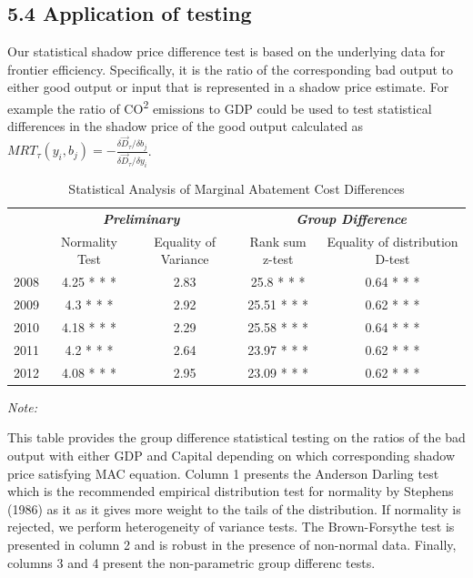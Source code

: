 \documentclass[
  10pt,
]{article}
\begin{document}
\hypertarget{application-of-testing}{%
\subsection{5.4 Application of testing}\label{application-of-testing}}

Our statistical shadow price difference test is based on the underlying
data for frontier efficiency. Specifically, it is the ratio of the
corresponding bad output to either good output or input that is
represented in a shadow price estimate. For example the ratio of
CO\textsuperscript{2} emissions to GDP could be used to test statistical
differences in the shadow price of the good output calculated as
\(MRT_{\tau}(y_{i},b_{j})=-\frac{\delta \vec{D}_{\tau}/\delta b_{j}}{\delta \vec{D}_{\tau}/\delta y_{i}}\).

\begin{table}[H]

\caption{\label{tab:table 6 test results}Statistical Analysis of Marginal Abatement Cost Differences}
\centering
\fontsize{8}{10}\selectfont
\begin{threeparttable}
\begin{tabular}[t]{lcccc}
\toprule
\multicolumn{1}{c}{\em{\textbf{}}} & \multicolumn{2}{c}{\em{\textbf{Preliminary}}} & \multicolumn{2}{c}{\em{\textbf{Group Difference }}} \\
\cmidrule(l{3pt}r{3pt}){2-3} \cmidrule(l{3pt}r{3pt}){4-5}
  & Normality Test & Equality of Variance & Rank sum z-test & Equality of distribution D-test\\
\midrule
2008 & 4.25 * * * & 2.83 & 25.8 * * * & 0.64 * * *\\
2009 & 4.3 * * * & 2.92 & 25.51 * * * & 0.62 * * *\\
2010 & 4.18 * * * & 2.29 & 25.58 * * * & 0.64 * * *\\
2011 & 4.2 * * * & 2.64 & 23.97 * * * & 0.62 * * *\\
2012 & 4.08 * * * & 2.95 & 23.09 * * * & 0.62 * * *\\
\bottomrule
\end{tabular}
\begin{tablenotes}
\item \textit{Note: } 
\item This table provides the group difference statistical testing on the ratios of the bad output with either GDP and Capital depending on which corresponding shadow price satisfying MAC equation. Column 1 presents the Anderson Darling test which is the recommended empirical distribution test for normality by Stephens (1986) as it as it gives more weight to the tails of the distribution.  If normality is rejected, we perform heterogeneity of variance tests. The Brown-Forsythe test is presented in column 2 and is robust in the presence of non-normal data. Finally, columns 3 and 4 present the non-parametric group differenc tests.
\end{tablenotes}
\end{threeparttable}
\end{table}
\end{document}
